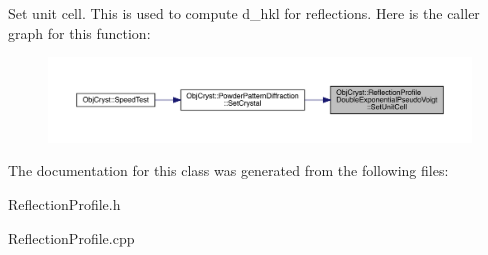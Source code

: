 Set unit cell. This is used to compute d\+\_\+hkl for reflections. Here is the caller graph for this function\+:
\nopagebreak
\begin{figure}[H]
\begin{center}
\leavevmode
\includegraphics[width=350pt]{class_obj_cryst_1_1_reflection_profile_double_exponential_pseudo_voigt_a917d6e23b96ac2a9ffc4b9e45002d505_icgraph}
\end{center}
\end{figure}


The documentation for this class was generated from the following files\+:\begin{DoxyCompactItemize}
\item 
Reflection\+Profile.\+h\item 
Reflection\+Profile.\+cpp\end{DoxyCompactItemize}
